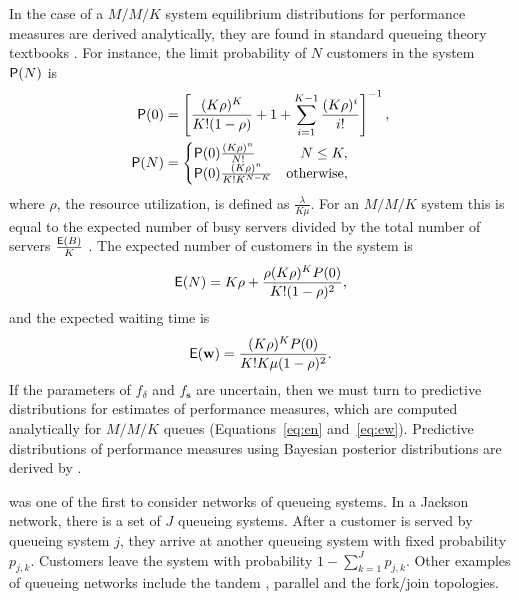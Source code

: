 \documentclass[article]{jss}
\begin{document}
In the case of a $M/M/K$ system equilibrium distributions for
performance measures are derived analytically, they are found in
standard queueing theory textbooks \citep{lipsky2008queueing,
  thomopoulos2012fundamentals}. For instance, the limit probability of
$N$ customers in the system $\mathsf{P}(N)$ is
%
\begin{align}
\mathsf{P}(0) &= \left[\frac{ (K \rho)^K}{K! (1 - \rho)} + 1 + \sum_{i=1}^{K-1} \frac{(K \rho)^i}{i!}   \right]^{-1}, \nonumber \\
\mathsf{P}(N) &= \begin{cases} 
\mathsf{P}(0) \frac{(K \rho)^n }{N!} & \quad  N \leq K,\\
\mathsf{P}(0) \frac{(K \rho)^n }{K! K^{N-K}} & \text{otherwise} ,
\end{cases} \label{eq:pn}
\end{align}
%
where $\rho$, the resource utilization, is defined as
$\frac{\lambda}{K \mu}$. For an $M/M/K$ system this is equal to the
expected number of busy servers divided by the total number of servers
$\frac{\mathsf{E}(B)}{K}$ \citep[p.~451]{cassandras2009introduction}. The
expected number of customers in the system is
\citep{bhat2015introduction}
%
\begin{align}
\mathsf{E}(N) = K\rho + \frac{\rho (K\rho)^K P(0)}{K!(1-\rho)^2} \label{eq:en},
\end{align}
%
and the expected waiting time is
%
\begin{align}
\mathsf{E}(\mathbf{w}) = \frac{(K \rho)^K P(0)}{K! K \mu(1-\rho)^2} \label{eq:ew}.
\end{align}
%
If the parameters of $f_\delta$ and $f_{\mathbf{s}}$ are uncertain,
then we must turn to predictive distributions for estimates of
performance measures, which are computed analytically for $M/M/K$
queues (Equations~\ref{eq:en} and~\ref{eq:ew}). Predictive
distributions of performance measures using Bayesian posterior
distributions are derived by \citet{armero1994bayesian,
  armero1999dealing}.

\citet{jackson_networks_1957} was one of the first to consider networks of queueing systems. In a Jackson network, there is a set of $J$ queueing systems. After a customer is served by queueing system $j$, they arrive at another queueing system with fixed probability $p_{j,k}$. Customers leave the system with probability $1 - \sum_{k=1}^{J} p_{j,k}$. Other examples of queueing networks include the tandem \citep{glynn_departures_1991}, parallel \citep{hunt_fast_1995} and the fork/join \citep{kim_analysis_1989} topologies. 
\end{document}
